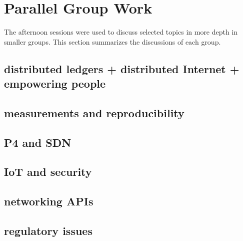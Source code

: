\section{Parallel Group Work}\label{sec:parallel-group-work}

The afternoon sessions were used to discuss selected topics in more depth in
smaller groups. This section summarizes the discussions of each group.


\subsection{distributed ledgers + distributed Internet + empowering people}

\subsection{measurements and reproducibility}

\subsection{P4 and SDN}

\subsection{IoT and security}

\subsection{networking APIs}


\subsection{regulatory issues}
